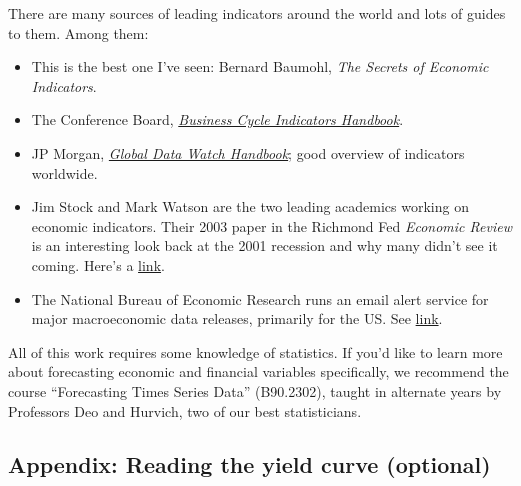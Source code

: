 \documentclass[letterpaper,12pt]{article}
\begin{document}
There are many sources of leading indicators around the world
and lots of guides to them.
Among them:  
%
\begin{itemize}

\item This is the best one I've seen:  
Bernard Baumohl, 
{\it The Secrets of Economic Indicators\/}.

\item The Conference Board, 
\href{http://www.conference-board.org/pdf_free/economics/bci/BCI-Handbook.pdf}
{\it Business Cycle Indicators Handbook\/}.

\item JP Morgan, 
\href{http://www.jpmorgan.com/pdfdoc/GlobalDataWatchHandbook.pdf}
{\it Global Data Watch Handbook\/};
good overview of indicators worldwide. 

\item Jim Stock and Mark Watson are the two leading academics working on 
economic indicators.  Their 2003 paper in the Richmond Fed {\it Economic Review\/}
is an interesting look back at the 2001 recession 
and why many didn't see it coming.  
Here's a 
\href{http://www.richmondfed.org/publications/economic_research/economic_quarterly/pdfs/summer2003/stockwatsonsummer03.pdf}
{link}.
\item The National Bureau of Economic Research 
runs an email alert service 
for major macroeconomic data releases, primarily for the US.  See 
\href{http://nber.org/releases/}{link}.


\end{itemize}
%
All of this work requires some knowledge of statistics.  
If you'd like to learn more about forecasting economic and financial variables
specifically, we recommend the
course ``Forecasting Times Series Data'' (B90.2302), taught in alternate years by Professors Deo
and Hurvich, two of our best statisticians.




\newpage 
\subsection*{Appendix:  Reading the yield curve (optional)}
\end{document}

